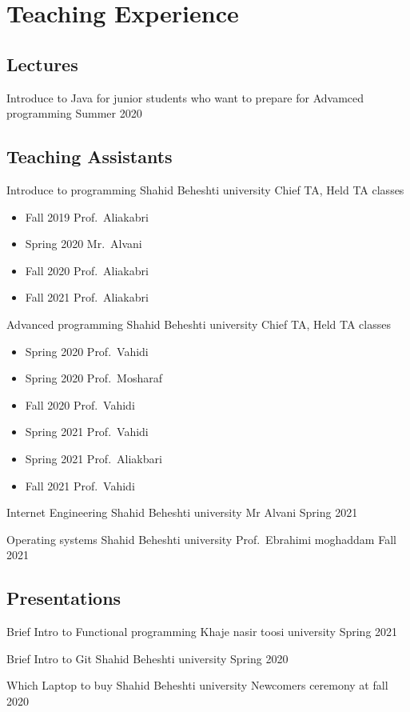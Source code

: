 \section{Teaching Experience}

\subsection{Lectures}
\cventry{}
  {Introduce to Java}
  {for junior students who want to prepare for Advamced programming}
  {}
  {}
  {Summer 2020}

\subsection{Teaching Assistants}

\cventry{}
  {Introduce to programming}
  {}
  {Shahid Beheshti university}
  {Chief TA, Held TA classes}
  {%
    \begin{itemize}
      \item Fall 2019 Prof.\ Aliakabri
      \item Spring 2020 Mr.\ Alvani
      \item Fall 2020 Prof.\ Aliakabri
      \item Fall 2021 Prof.\ Aliakabri
    \end{itemize}
 }
\cventry{}
  {Advanced programming}
  {}
  {Shahid Beheshti university}
  {Chief TA, Held TA classes}
  {%
    \begin{itemize}
      \item Spring 2020 Prof.\ Vahidi
      \item Spring 2020 Prof.\ Mosharaf
      \item Fall 2020 Prof.\ Vahidi
      \item Spring 2021 Prof.\ Vahidi
      \item Spring 2021 Prof.\ Aliakbari
      \item Fall 2021 Prof.\ Vahidi
    \end{itemize}
 }

\cventry{}
  {Internet Engineering}
  {}
  {Shahid Beheshti university}
  {Mr Alvani}
  {Spring 2021}

\cventry{}
  {Operating systems}
  {}
  {Shahid Beheshti university}
  {Prof.\ Ebrahimi moghaddam}
  {Fall 2021}

\subsection{Presentations}

\cventry{}
  {Brief Intro to Functional programming}
  {}
  {Khaje nasir toosi university}
  {}
  {Spring 2021}


\cventry{}
  {Brief Intro to Git}
  {}
  {Shahid Beheshti university}
  {}
  {Spring 2020}


\cventry{}
  {Which Laptop to buy}
  {}
  {Shahid Beheshti university}
  {}
  {Newcomers ceremony at fall 2020}

